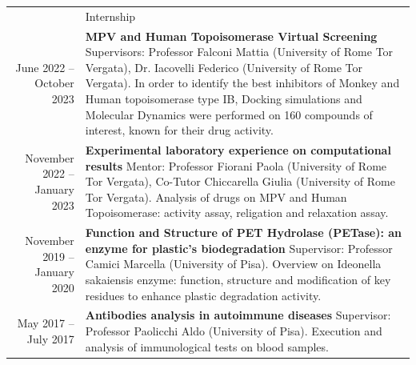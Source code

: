 \documentclass[letterpaper, 11pt]{article}
\newcommand{\headingfont}{\Large\color{OliveGreen}}
\newenvironment{SectionTable}[1]{
	\renewcommand*{\arraystretch}{1.7}
	\setlength{\tabcolsep}{10pt}
	\begin{longtable}{Rp{5.4in}} & #1 \\}
{\end{longtable}\vspace{-.3cm}}
\begin{document}
\begin{SectionTable}{\headingfont Internship}
June 2022 -- October 2023 &
\textbf{MPV and Human Topoisomerase Virtual Screening} \newline
Supervisors: Professor Falconi Mattia (University of Rome Tor Vergata), Dr. Iacovelli Federico (University of Rome Tor Vergata). \newline
In order to identify the best inhibitors of Monkey and Human topoisomerase type IB, Docking simulations and Molecular Dynamics were performed on 160 compounds of interest, known for their drug activity.\\ 

November 2022 -- January 2023 &
\textbf{Experimental laboratory experience on computational results}\newline
Mentor: Professor Fiorani Paola (University of Rome Tor Vergata), Co-Tutor Chiccarella Giulia (University of Rome Tor Vergata). \newline
Analysis of drugs on MPV and Human Topoisomerase: activity assay, religation and relaxation assay.\\

November 2019 -- January 2020 &
\textbf{Function and Structure of PET Hydrolase (PETase): an enzyme for plastic's biodegradation} \newline
Supervisor: Professor Camici Marcella (University of Pisa). \newline
Overview on Ideonella sakaiensis enzyme: function, structure and modification of key residues to enhance plastic degradation activity.  \\ %

May 2017 -- July 2017 &
\textbf{Antibodies analysis in autoimmune diseases}\newline
Supervisor: Professor Paolicchi Aldo (University of Pisa).\newline
Execution and analysis of immunological tests on blood samples.\\
\end{SectionTable}

\end{document}
